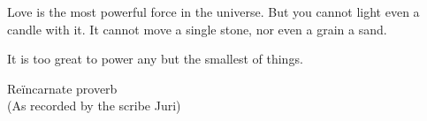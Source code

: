 Love is the most powerful force in the universe. But you cannot light
even a candle with it. It cannot move a single stone, nor even a grain a
sand.

It is too great to power any but the smallest of things.

\hfill
  \begin{minipage}{.75\textwidth}
    \noindent\emdashStart
    Reïncarnate proverb  \\ (As recorded by the scribe Juri)
    \end{minipage}

